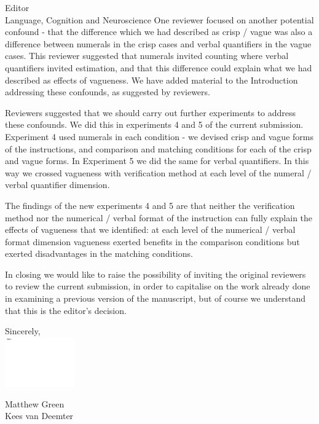\documentclass{letter}
\begin{document}
\begin{letter}{Editor\\
Language, Cognition and Neuroscience}
One reviewer focused on another potential confound - that the difference which we had described as crisp / vague was also a difference between numerals in the crisp cases and verbal quantifiers in the vague cases.  This reviewer suggested that numerals invited counting where verbal quantifiers invited estimation, and that this difference could explain what we had described as effects of vagueness.  We have added material to the Introduction addressing these confounds, as suggested by reviewers.

Reviewers suggested that we should carry out further experiments to address these confounds. We did this in experiments 4 and 5 of the current submission.  Experiment 4 used numerals in each condition - we devised crisp and vague forms of the instructions, and comparison and matching conditions for each of the crisp and vague forms. In Experiment 5 we did the same for verbal quantifiers. In this way we crossed vagueness with verification method at each level of the numeral / verbal quantifier dimension.

The findings of the new experiments 4 and 5 are that neither the verification method nor the numerical / verbal format of the instruction can fully explain the effects of vagueness that we identified: at each level of the numerical / verbal format dimension vagueness exerted benefits in the comparison conditions but exerted disadvantages in the matching conditions.

In closing we would like to raise the possibility of inviting the original reviewers to review the current submission, in order to capitalise on the work already done in examining a previous version of the manuscript, but of course we understand that this is the editor's decision.

\closing{Sincerely,\\
\includegraphics[width=3cm]{mysignature.pdf}
}
Matthew Green\\
Kees van Deemter
\end{letter}
\end{document}
